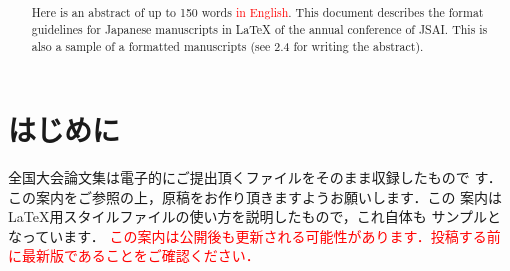 \usepackage{color}

\title{
}


\author{%
\and
{}
}



\begin{abstract}
Here is an abstract of up to 150 words \textcolor{red}{in English}. 
This document describes the format guidelines for Japanese manuscripts in \LaTeX{} of the annual conference of JSAI. 
This is also a sample of a formatted manuscripts (see 2.4 for writing the abstract).
\end{abstract}

\def\Style{``jsaiac.sty''}
\def\BibTeX{{\rm B\kern-.05em{\sc i\kern-.025em b}\kern-.08em%
 T\kern-.1667em\lower.7ex\hbox{E}\kern-.125emX}}
\def\JBibTeX{\leavevmode\lower .6ex\hbox{J}\kern-0.15em\BibTeX}
\def\LaTeXe{\LaTeX\kern.15em2$_{\textstyle\varepsilon}$}


\maketitle

\section{はじめに}
全国大会論文集は電子的にご提出頂くファイルをそのまま収録したもので
す．この案内をご参照の上，原稿をお作り頂きますようお願いします．この
案内は \LaTeX 用スタイルファイルの使い方を説明したもので，これ自体も
サンプルとなっています．
\textcolor{red}{この案内は公開後も更新される可能性があります．投稿する前に最新版であることをご確認ください．}

